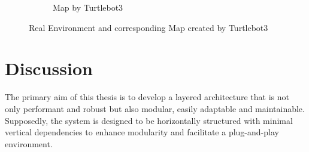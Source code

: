\documentclass[%
paper=A4,               %
twoside=true,           %
openright,              %
11pt,                   %
bibliography=totoc,     %
titlepage=on,           %
DIV=12,                 %
BCOR=1.5cm,             %
parskip=half,            %
final
]{scrreprt}
\begin{document}
\begin{figure}[H]
\begin{subfigure}[b]{0.45\textwidth}
			\caption{Map by Turtlebot3}
			\label{fig:fig15}
		\end{subfigure}
		
		\caption{Real Environment and corresponding Map created by Turtlebot3}
		\label{fig:RealWorldSetup}
	\end{figure}	
	
	
	\chapter{Discussion}
	The primary aim of this thesis is to develop a layered architecture that is not only performant and robust but also modular, easily adaptable and maintainable. Supposedly, the system is designed to be horizontally structured with minimal vertical dependencies to enhance modularity and facilitate a plug-and-play environment. \newline
	
\end{document}
